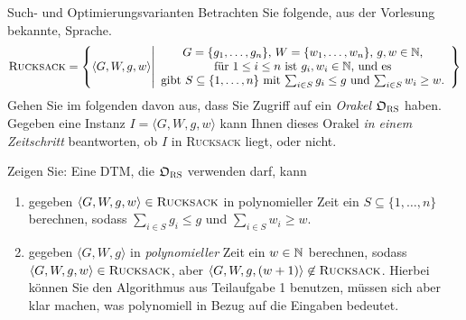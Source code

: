 \documentclass[answers]{submit}
\begin{document}
\begin{exercise}[12]{Such- und Optimierungsvarianten}
  Betrachten Sie folgende, aus der Vorlesung bekannte, Sprache.
  \[ \textsc{Rucksack} = \left\{ \langle G,W,g,w\rangle \middle| \begin{array}{c} \mbox{$G = \{g_1,\dots,g_n\}$, $W = \{w_1,\dots,w_n\}$, $g,w\in\mathbb{N}$,} \\ \mbox{für $1\leq i\leq n$ ist $g_i,w_i\in\mathbb{N}$, und es} \\ \mbox{gibt $S\subseteq\{1,\dots,n\}$ mit $\sum_{i\in S} g_i \leq g$ und $\sum_{i\in S} w_i\geq w$.} \end{array} \right\} \]
  Gehen Sie im folgenden davon aus, dass Sie Zugriff auf ein \emph{Orakel} $\mathfrak{O}_{\textsc{RS}}$ haben.
  Gegeben eine Instanz $I = \langle G,W,g,w\rangle$ kann Ihnen dieses Orakel \emph{in einem Zeitschritt} beantworten, ob $I$ in \textsc{Rucksack} liegt, oder nicht.

  Zeigen Sie:
  Eine DTM, die $\mathfrak{O}_{\textsc{RS}}$ verwenden darf, kann
  \begin{enumerate}
    \item gegeben $\langle G,W,g,w\rangle\in\textsc{Rucksack}$ in polynomieller Zeit ein $S\subseteq \{1,\dots,n\}$ berechnen, sodass $\sum_{i\in S} g_i \leq g$ und $\sum_{i\in S} w_i\geq w$.
    \item gegeben $\langle G,W,g\rangle$ in \emph{polynomieller} Zeit ein $w\in \mathbb{N}$ berechnen, sodass $\langle G,W,g,w\rangle\in \textsc{Rucksack}$, aber $\langle G,W,g,(w+1)\rangle\not\in \textsc{Rucksack}$.
          Hierbei können Sie den Algorithmus aus Teilaufgabe 1 benutzen, müssen sich aber klar machen, was polynomiell in Bezug auf die Eingaben bedeutet.
  \end{enumerate}

\end{exercise}
\end{document}

